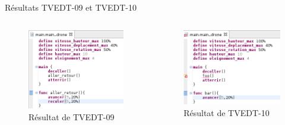 \documentclass{bredelebeamer}
\begin{document}
\begin{frame}{Résultats TVEDT-09 et TVEDT-10} 
\begin{columns}
\begin{column}{0.5\textwidth}
\begin{figure}
\centering
\includegraphics[scale=0.4]{images/TVEDT-09.png}
\caption{Résultat de TVEDT-09}
\end{figure}
\end{column}
\begin{column}{0.5\textwidth}
\begin{figure}
\centering
\includegraphics[scale=0.43]{images/TVEDT-10.png}
\caption{Résultat de TVEDT-10}
\end{figure}
\end{column}
\end{columns}
\end{frame}
\end{document}
